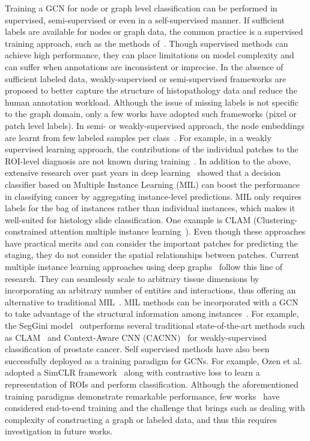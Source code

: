 Training a GCN for node or graph level classification can be performed in supervised, semi-supervised or even in a self-supervised manner. 
If sufficient labels are available for nodes or graph data, the common practice is a supervised training approach, such as the methods of~. 
Though supervised methods can achieve high performance, they can place limitations on model complexity and can suffer when annotations are inconsistent or imprecise. 
In the absence of sufficient labeled data, weakly-supervised or semi-supervised frameworks are proposed to better capture the structure of histopathology data and reduce the human annotation workload. 
Although the issue of missing labels is not specific to the graph domain, only a few works have adopted such frameworks (pixel or patch level labels).
In semi- or weakly-supervised approach, the node embeddings are learnt from few labeled samples per class~.
For example, in a weakly supervised learning approach, the contributions of the individual patches to the ROI-level diagnosis are not known during training{~}.
In addition to the above, extensive research over past years in deep learning~ showed that a decision classifier based on Multiple Instance Learning (MIL) can boost the performance in classifying cancer by aggregating instance-level predictions. 
MIL only requires labels for the bag of instances rather than individual instances, which makes it well-suited for histology slide classification. One example is CLAM (Clustering-constrained attention multiple instance learning{~}). Even though these approaches have practical merits and can consider the important patches for predicting the staging, they do not consider the spatial relationships between patches.
Current multiple instance learning approaches using deep graphs~ follow this line of research.
They can seamlessly scale to arbitrary tissue dimensions by incorporating an arbitrary number of entities and interactions, thus offering an alternative to traditional MIL{~}.
MIL methods can be incorporated with a GCN to take advantage of the structural information among instances{~}. For example, the SegGini model{~} outperforms several traditional state-of-the-art methods such as CLAM{~} and Context-Aware CNN (CACNN){~} for weakly-supervised classification of prostate cancer.
Self supervised methods have also been successfully deployed as a training paradigm for GCNs. For example, Ozen et al.~ adopted a SimCLR framework~ along with contrastive loss to learn a representation of ROIs and perform classification.
Although the aforementioned training paradigms demonstrate remarkable performance, few works~ have considered end-to-end training and the challenge that brings such as dealing with complexity of constructing a graph or labeled data, and thus this requires investigation in future works.  

